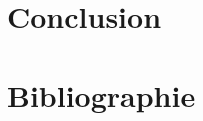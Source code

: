\documentclass[
  a4paper,
  DIV=11,
  numbers=noendperiod,
  listof=totoc]{scrreprt}
\begin{document}
\newpage{}

\chapter{Conclusion}\label{conclusion}

\newpage{}

\hypertarget{Bibliographie}{%
\chapter*{\centering Bibliographie}\label{Bibliographie}}
\singlespace

\printbibliography[heading=none]
\end{document}
